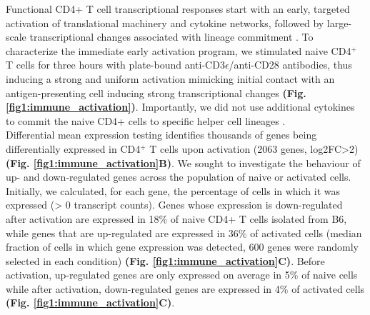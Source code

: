 Functional CD4+ T cell transcriptional responses start with an early, targeted activation of translational machinery and cytokine networks, followed by large-scale transcriptional changes associated with lineage commitment \citep{Shay2013, Asmal2003}. To characterize the immediate early activation program, we stimulated naive CD4$^+$ T cells for three hours with plate-bound anti-CD3$\epsilon$/anti-CD28 antibodies, thus inducing a strong and uniform activation mimicking initial contact with an antigen-presenting cell inducing strong transcriptional changes \textbf{(Fig. \ref{fig1:immune_activation})}. Importantly, we did not use additional cytokines to commit the naive CD4+ cells to specific helper cell lineages \citep{Zhu2010}. \\
Differential mean expression testing identifies thousands of genes being differentially expressed in CD4$^+$ T cells upon activation (2063 genes, log2FC>2) \textbf{(Fig. \ref{fig1:immune_activation}B)}. We sought to investigate the behaviour of up- and down-regulated genes across the population of naive or activated cells. Initially, we calculated, for each gene, the percentage of cells in which it was expressed (> 0 transcript counts). Genes whose expression is down-regulated after activation are expressed in 18\% of naive CD4+ T cells isolated from B6, while genes that are up-regulated are expressed in 36\% of activated cells (median fraction of cells in which gene expression was detected, 600 genes were randomly selected in each condition) \textbf{(Fig. \ref{fig1:immune_activation}C)}. Before activation, up-regulated genes are only expressed on average in 5\% of naive cells while after activation, down-regulated genes are expressed in 4\% of activated cells \textbf{(Fig. \ref{fig1:immune_activation}C)}. 

\newpage

